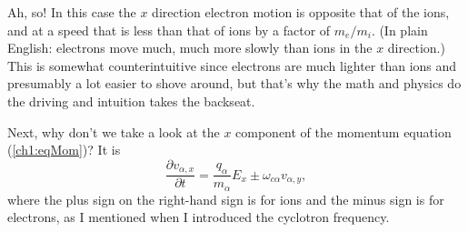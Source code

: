 Ah, so! In this case the $x$ direction electron motion is opposite that of the
ions, and at a speed that is less than that of ions by a factor of $m_e /
m_i$. (In plain English: electrons move much, much more slowly than ions in the
$x$ direction.) This is somewhat counterintuitive since electrons are much
lighter than ions and presumably a lot easier to shove around, but that's why
the math and physics do the driving and intuition takes the backseat.

Next, why don't we take a look at the $x$ component of the momentum equation
(\ref{ch1:eqMom})? It is
\begin{equation}
\label{ch1:eqMomx} \dfrac{\partial v_{\alpha, x}}{\partial t} = \dfrac{q_\alpha}{m_\alpha} E_x \pm \omega_{c \alpha} v_{\alpha, y},
\end{equation}
where the plus sign on the right-hand sign is for ions and the minus sign is for
electrons, as I mentioned when I introduced the cyclotron frequency.  

